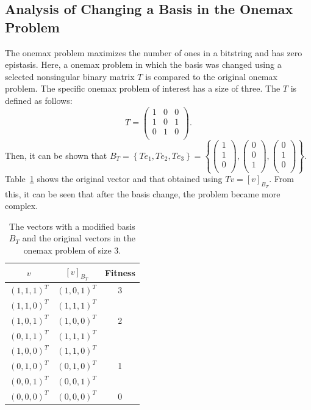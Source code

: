 \subsection{Analysis of Changing a Basis in the Onemax Problem} \label{sec32:cob_onemax}
The onemax problem maximizes the number of ones in a bitstring and has zero epistasis. Here, a onemax problem in which the basis was changed using a selected nonsingular binary matrix $ T $ is compared to the original onemax problem. The specific onemax problem of interest has a size of three. The $ T $ is defined as follows:
\begin{equation*}
T=\left(\begin{matrix}1&0&0\\1&0&1\\0&1&0\\\end{matrix}\right).
\end{equation*}
Then, it can be shown that $ B_T=\left\{Te_1,Te_2,Te_3\right\}=\left\{\left(\begin{matrix}1\\1\\0\\\end{matrix}\right),  \left(\begin{matrix}0\\0\\1\\\end{matrix}\right),\left(\begin{matrix}0\\1\\0\\\end{matrix}\right)\right\}$. Table~\ref{tab:onemax} shows the original vector and that obtained using $ Tv=\left[v\right]_{B_T} $. From this, it can be seen that after the basis change, the problem became more complex.

\begin{table}[H]
	\caption{The vectors with a modified basis $ B_T $ and the original vectors in the onemax problem of size 3.} \label{tab:onemax}
	\centering
	\vspace{0.2cm}
	\begin{tabular}{ccc}
		\toprule
		$ v $ & $ \left[v \right]_{B_T} $ & Fitness   \\ 
		\midrule
		$ (1,1,1)^T $ & $ (1,0,1)^T $ & 3   \\ \midrule
		$ (1,1,0)^T $ & $ (1,1,1)^T $ &    \\
		$ (1,0,1)^T $ & $ (1,0,0)^T $ & 2   \\
		$ (0,1,1)^T $ & $ (1,1,1)^T $ &    \\ \midrule
		$ (1,0,0)^T $ & $ (1,1,0)^T $ &    \\
		$ (0,1,0)^T $ & $ (0,1,0)^T $ & 1   \\
		$ (0,0,1)^T $ & $ (0,0,1)^T $ &    \\ \midrule
		$ (0,0,0)^T $ & $ (0,0,0)^T $ & 0   \\
		\bottomrule
	\end{tabular}
\end{table}

